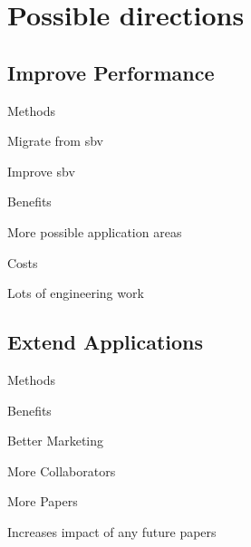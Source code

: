 \documentclass[presentation]{beamer}
\begin{document}
\section{Possible directions}
\label{sec:org804e2eb}

\subsection{Improve Performance}
\label{sec:org7cf241e}

\begin{frame}[label={sec:orgc74b294}]{Methods}
\begin{block}{Migrate from sbv}
\end{block}
\begin{block}{Improve sbv}
\end{block}
\end{frame}

\begin{frame}[label={sec:org515433a}]{Benefits}
\begin{block}{More possible application areas}
\end{block}
\end{frame}

\begin{frame}[label={sec:org5c081e7}]{Costs}
\begin{block}{Lots of engineering work}
\end{block}
\end{frame}

\subsection{Extend Applications}
\label{sec:org0ddd78a}

\begin{frame}[label={sec:org3fcd6fc}]{Methods}
\end{frame}

\begin{frame}[label={sec:orga09e69c}]{Benefits}
\begin{block}{Better Marketing}
\end{block}

\begin{block}{More Collaborators}
\end{block}

\begin{block}{More Papers}
\end{block}

\begin{block}{Increases impact of any future papers}
\end{block}
\end{frame}
\end{document}
